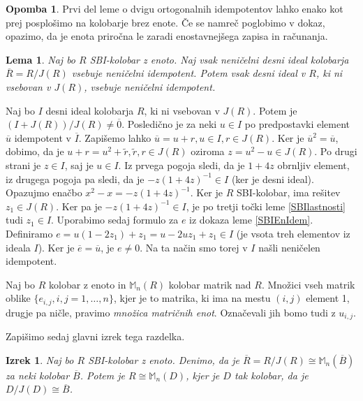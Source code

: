 \documentclass[a4paper, 12pt]{amsart}
\theoremstyle{definition} %
\newtheorem{opomba}[definicija]{Opomba}
\theoremstyle{plain} %
\newtheorem{lema}[definicija]{Lema}
\newtheorem{izrek}[definicija]{Izrek}
\newcommand{\M}{\mathbb M}
\begin{document}
\begin{opomba}
Prvi del leme o dvigu ortogonalnih idempotentov lahko enako kot prej posplošimo na kolobarje brez enote. Če se namreč poglobimo v dokaz, opazimo, da je enota priročna le zaradi enostavnejšega zapisa in računanja. 
\end{opomba}

\begin{lema}
Naj bo $R$ SBI-kolobar z enoto. Naj vsak neničelni desni ideal kolobarja $\overline{R} = R/J(R)$ vsebuje neničelni idempotent. Potem vsak desni ideal v $R$, ki ni vsebovan v $J(R)$, vsebuje neničelni idempotent.
\end{lema}

\proof
Naj bo $I$ desni ideal kolobarja $R$, ki ni vsebovan v $J(R)$. Potem je $(I+J(R))/J(R) \neq \overline{0}$. Posledično je za neki $u\in I$ po predpostavki element $\overline{u}$ idempotent v $\overline{I}$. Zapišemo lahko $\overline{u} = u + r, u\in I, r \in J(R)$. Ker je $\overline{u}^2 = \overline{u}$, dobimo, da je $u+r = u^2 + \tilde{r}, \tilde{r},r\in J(R)$ oziroma $z= u^2 - u\in J(R)$. Po drugi strani je $z\in I$, saj je $u\in I$. Iz prvega pogoja sledi, da je $1+4z$ obrnljiv element, iz drugega pogoja pa sledi, da je $-z(1+4z)^{-1}\in I $ (ker je desni ideal). Opazujmo enačbo $x^2 - x = -z(1+4z)^{-1} $. Ker je $R$ SBI-kolobar, ima rešitev $z_1 \in J(R)$. Ker pa je $-z(1+4z)^{-1}\in I$, je po tretji točki leme \ref{SBIlastnosti} tudi $z_1\in I$. Uporabimo sedaj formulo za $e$ iz dokaza leme \ref{SBIEnIdem}. Definiramo $e=u(1-2z_1) + z_1 = u - 2uz_1 + z_1\in I$ (je vsota treh elementov iz ideala  $I$). Ker je $\overline{e} = \overline{u}$, je $e\neq 0$. Na ta način smo torej v $I$ našli neničelen idempotent.
\endproof

Naj bo $R$ kolobar z enoto in $\M_n(R)$ kolobar matrik nad $R$. Množici vseh matrik oblike $\{e_{i,j}, i,j=1,\dots,n\}$, kjer je to matrika, ki ima na mestu $(i,j)$ element 1, drugje pa ničle,  pravimo \emph{množica matričnih enot}. Označevali jih bomo tudi z $u_{i,j}$.

Zapišimo sedaj glavni izrek tega razdelka.

\begin{izrek}
\label{SBIizrek}
Naj bo $R$ SBI-kolobar z enoto. Denimo, da je $\overline{R}  = R/J(R) \cong \M_n(\overline{B})$ za neki kolobar $\overline{B}$. Potem je $R \cong \M_n(D)$, kjer je $D$ tak kolobar, da je  $D/J(D) \cong \overline{B}$.
\end{izrek}
\end{document}
